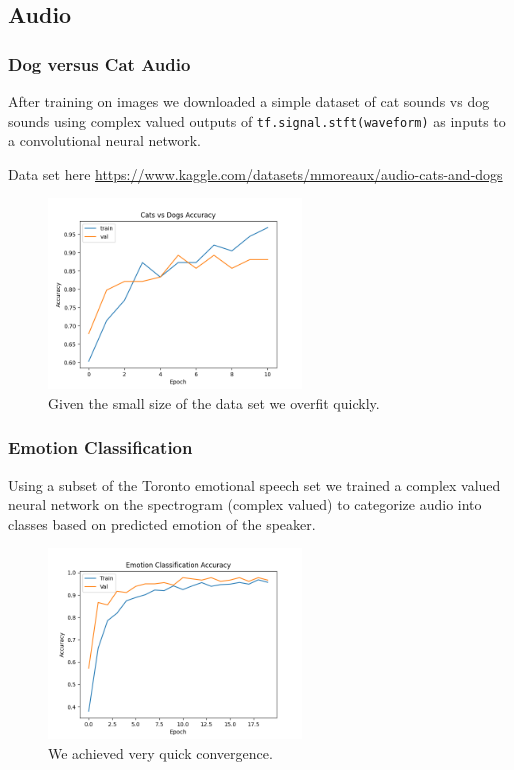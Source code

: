 \documentclass{article}
\let\citep\parencite   %
\begin{document}
\subsection{Audio}
\subsubsection{Dog versus Cat Audio}
After training on images we downloaded a simple dataset of cat sounds vs dog sounds using complex valued outputs of \texttt{tf.signal.stft(waveform)} as inputs to a convolutional neural network.

 Data set here \url{https://www.kaggle.com/datasets/mmoreaux/audio-cats-and-dogs}
\begin{figure}[H]
  \centering
  \includegraphics[width=0.6\textwidth]{../figs/cats_dogs_accuracy.png}
  \caption{Given the small size of the data set we overfit quickly.}
\end{figure}
\subsubsection{Emotion Classification}
Using a subset of the Toronto emotional speech set \citep{TESS} we trained a complex valued neural network on the spectrogram (complex valued) to categorize audio into classes based on predicted emotion of the speaker.

\begin{figure}[H]
  \centering
  \includegraphics[width=0.6\textwidth]{../figs/emotion_accuracy.png}
  \caption{We achieved very quick convergence.}
\end{figure}
\end{document}
